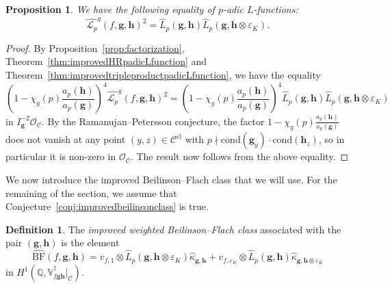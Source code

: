 \documentclass[a4paper,11pt]{amsart}
\theoremstyle{plain}
\newtheorem{propo}[theorem]{Proposition}
\theoremstyle{definition}
\newtheorem{defi}[theorem]{Definition}
\theoremstyle{remark}
\newtheorem{remarkwr}[theorem]{Remark}
\newenvironment{remark}{\begin{remarkwr}\begin{upshape}}{\end{upshape}\end{remarkwr}}
\newcommand{\bb}{\mathbb}
\newcommand{\cl}{\mathcal}
\newcommand{\Lp}{{\mathscr{L}_p}}
\newcommand{\hg}{{\mathbf{g}}}
\newcommand{\hh}{{\mathbf h}}
\numberwithin{equation}{section}
\begin{document}
\begin{propo}\label{prop:improvedfactorization}
    We have the following equality of $p$-adic $L$-functions:
    \[
    \widehat{\Lp}^g(f,\hg,\hh)^2=\widehat{L}_p(\hg,\hh)\widehat{L}_p(\hg,\hh\otimes\varepsilon_K).
    \]
\end{propo}
\begin{proof}
    By Proposition~\ref{prop:factorization}, Theorem~\ref{thm:improvedHRpadicLfunction} and Theorem~\ref{thm:improvedtripleproductpadicLfunction}, we have the equality
    \[
    \left(1-\chi_g(p)\frac{a_p(\hh)}{a_p(\hg)}\right)^4 \widehat{\Lp}^g(f,\hg,\hh)^2=\left(1-\chi_g(p)\frac{a_p(\hh)}{a_p(\hg)}\right)^4\widehat{L}_p(\hg,\hh)\widehat{L}_p(\hg,\hh\otimes\varepsilon_K)
    \]
    in $I_{\hg}^{-2}\cl{O}_{\cl{C}}$. By the Ramanujan--Petersson conjecture, the factor $1-\chi_g(p)\frac{a_p(\hh)}{a_p(\hg)}$ does not vanish at any point $(y,z)\in\cl{C}^{\mathrm{cl}}$ with $p\nmid \mathrm{cond}(\hg_y)\cdot \mathrm{cond}(\hh_z)$, so in particular it is non-zero in $\cl{O}_{\cl{C}}$. The result now follows from the above equality.
\end{proof}

We now introduce the improved Beilinson--Flach class that we will use. For the remaining of the section, we assume that Conjecture~\ref{conj:improvedbeilinsonclass} is true.

\begin{defi}
The \emph{improved weighted Beilinson--Flach class} associated with the pair $(\hg,\hh)$ is the element
\[
\widehat{\mathrm{BF}}(f,\hg,\hh)=v_{f,1}\otimes \widehat{L}_p(\hg,\hh\otimes\varepsilon_K)\widehat{\kappa}_{\hg,\hh}+v_{f,\varepsilon_K}\otimes\widehat{L}_p(\hg,\hh)\widehat{\kappa}_{\hg,\hh\otimes \varepsilon_K}
\]
in $H^1(\bb{Q},\bb{V}_{f\hg\hh}^\dagger\vert_{\cl{C}})$.   
\end{defi}

\end{document}
